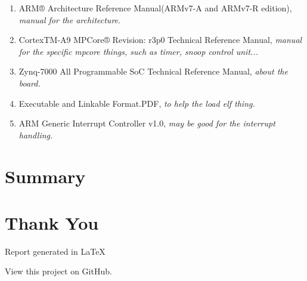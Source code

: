 \documentclass{article}
\begin{document}
\begin{enumerate}
	\item	ARM® Architecture Reference Manual(ARMv7-A and ARMv7-R edition), \emph{manual for the architecture}.
	\item CortexTM-A9 MPCore® Revision: r3p0 Technical Reference Manual, \emph{manual for the specific mpcore things, such as timer, snoop control unit...}
	\item	Zynq-7000 All Programmable SoC Technical Reference Manual, \emph{about the board.}
	\item	Executable and Linkable Format.PDF, \emph{to help the load elf thing.}
	\item ARM Generic Interrupt Controller v1.0, \emph{may be good for the interrupt handling.}
\end{enumerate}

\section{Summary}

\section{Thank You}

\indent \indent Report generated in \LaTeX

View this project on GitHub.

\begin{thebibliography}{99}
\end{thebibliography}
\end{document}
